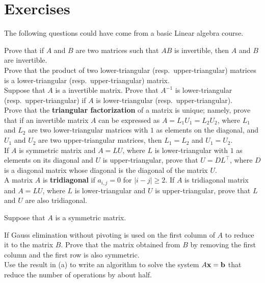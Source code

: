 \section{Exercises}

\begin{question}
The following questions could have come from a basic Linear algebra
course.

 Prove that if $A$ and $B$ are two \nn matrices such that $AB$ is
invertible, then $A$ and $B$ are invertible.\\
 Prove that the product of two lower-triangular (resp.\
upper-triangular) matrices is a lower-triangular
(resp.\ upper-triangular) matrix.\\
 Suppose that $A$ is a \nn invertible matrix.  Prove that
$A^{-1}$ is lower-triangular (resp.\ upper-triangular) if
$A$ is lower-triangular (resp.\ upper-triangular).\\
 Prove that the
{\bfseries triangular factorization}
of a \nn matrix is unique; namely, prove that if an invertible matrix
$A$ can be expressed as $A = L_1U_1 = L_2U_2$, where $L_1$ and $L_2$
are two lower-triangular matrices with $1$ as elements on the
diagonal, and $U_1$ and $U_2$ are two upper-triangular matrices, then
$L_1 = L_2$ and $U_1 = U_2$.\\
 If $A$ is \nn symmetric matrix and $A = LU$, where $L$ is
lower-triangular with $1$ as elements on its diagonal and $U$ is
upper-triangular, prove that $U = DL^\top$, where $D$ is a diagonal
matrix whose diagonal is the diagonal of the matrix $U$.\\
 A matrix $A$ is
{\bfseries tridiagonal}
if $a_{i,j} = 0$ for $|i-j|\geq 2$.  If $A$ is \nn tridiagonal matrix
and $A = LU$, where $L$ is lower-triangular and $U$ is
upper-triangular, prove that $L$ and $U$ are also tridiagonal.
\label{solvCQ1}
\end{question}

\begin{question}
Suppose that $A$ is a \nn symmetric matrix.

 If Gauss elimination without pivoting is used on the first
column of $A$ to reduce it to the \nn matrix $B$.  Prove that the
\nm{(n-1)}{(n-1)} matrix obtained from $B$ by removing the first
column and the first row is also symmetric.\\
 Use the result in (a) to write an algorithm to solve the
system $A \mathbf{x} = \mathbf{b}$ that reduce the number of operations by
about half.
\label{solvCQ2}
\end{question}

